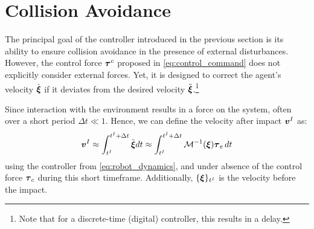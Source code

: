 \section{Collision Avoidance} \label{sec:collision_avoidance}

The principal goal of the controller introduced in the previous section is its ability to ensure collision avoidance in the presence of external disturbances.
However, the control force $\boldsymbol{\tau}^c$ proposed in \eqref{eq:control_command} does not explicitly consider external forces. Yet, it is designed to correct the agent's velocity $\dot{\boldsymbol{\xi}}$ if it deviates from the desired velocity $\ddot{\boldsymbol{\xi}}$.\footnote{Note that for a discrete-time (digital) controller, this results in a delay.}

Since interaction with the environment results in a force on the system, often over a short period $\Delta t \ll 1$.  Hence, we can define the velocity after impact $\boldsymbol{v}^I$ as:
\begin{align}
	\boldsymbol{v}^I
	  \approx \int_{t^I}^{t^I + \Delta t} \ddot{\boldsymbol{\xi}} dt  
	  \approx \int_{t^I}^{t^I + \Delta t} \mathcal{M}^{-1}(\boldsymbol{\xi})  \boldsymbol{\tau}_e \, dt  
	  \label{eq:impact_velocity}
\end{align}
using the controller from \eqref{eq:robot_dynamics}, and under absence of the control force $\boldsymbol{\tau}_c$ during this short timeframe. Additionally, $\{\boldsymbol{\xi} \}_{t^I}$ is the velocity before the impact.
 

